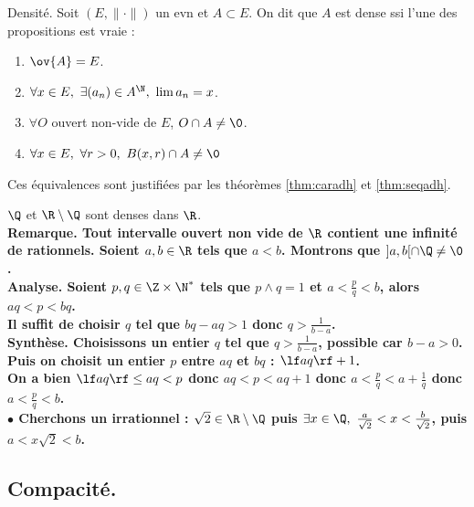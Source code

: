 \documentclass[11pt]{article}
\begin{document}
\vspace*{-0.7cm}

\begin{defi}{Densité.}{}
    Soit $(E,\|\cdot\|)$ un evn et $A\subset E$. On dit que $A$ est dense ssi l'une des propositions est vraie :
    \begin{enumerate}
        \item $\ov{A}=E$.
        \item $\forall x \in E, ~ \exists (a_n) \in A^\N, ~ \lim a_n = x$.
        \item $\forall O$ ouvert non-vide de $E$, $O\cap A \neq \0$.
        \item $\forall x \in E, ~ \forall r > 0, ~ B(x,r) \cap A \neq \0$
    \end{enumerate}
    Ces équivalences sont justifiées par les théorèmes \ref{thm:caradh} et \ref{thm:seqadh}.
\end{defi}

\vspace*{-0.7cm}

\begin{prop}{}{}
    $\Q$ et $\R\setminus\Q$ sont denses dans $\R$.\\
    \bf{Remarque.} Tout intervalle ouvert non vide de $\R$ contient une infinité de rationnels.
    \tcblower
    Soient $a,b\in\R$ tels que $a<b$. Montrons que $]a,b[\cap\Q\neq\0$.\\
    \bf{Analyse.} Soient $p,q\in\Z\times\N^*$ tels que $p\land q = 1$ et $a<\frac{p}{q}<b$, alors $aq<p<bq$.\\
    Il suffit de choisir $q$ tel que $bq-aq>1$ donc $q>\frac{1}{b-a}$.\\
    \bf{Synthèse.} Choisissons un entier $q$ tel que $q>\frac{1}{b-a}$, possible car $b-a>0$.\\
    Puis on choisit un entier $p$ entre $aq$ et $bq$ : $\lf aq \rf + 1$.\\
    On a bien $\lf aq \rf \leq aq < p$ donc $aq < p < aq + 1$ donc $a<\frac{p}{q}<a+\frac{1}{q}$ donc $a<\frac{p}{q}<b$.\\
    $\bullet$ Cherchons un irrationnel : $\sqrt{2}\in\R\setminus\Q$ puis $\exists x \in \Q, ~ \frac{a}{\sqrt{2}} < x < \frac{b}{\sqrt{2}}$, puis $a<x\sqrt{2}<b$.
\end{prop}

\vspace*{-0.7cm}

\subsection{Compacité.}
\end{document}
